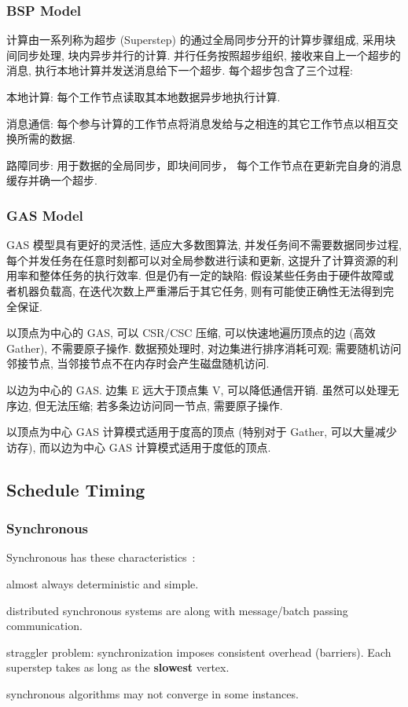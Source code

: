\documentclass[UTF8,12pt,a4paper]{article}
\begin{document}
\subsubsection{BSP Model}
计算由一系列称为超步 (Superstep) 的通过全局同步分开的计算步骤组成,
采用块间同步处理, 块内异步并行的计算.
并行任务按照超步组织, 接收来自上一个超步的消息, 执行本地计算并发送消息给下一个超步.
每个超步包含了三个过程:
\begin{compactitem}
  \item 本地计算: 每个工作节点读取其本地数据异步地执行计算.
  \item 消息通信: 
  每个参与计算的工作节点将消息发给与之相连的其它工作节点以相互交换所需的数据.
  \item 路障同步: 用于数据的全局同步，即块间同步，
  每个工作节点在更新完自身的消息缓存并确一个超步.
\end{compactitem}
\subsubsection{GAS Model}
GAS 模型具有更好的灵活性, 适应大多数图算法,
并发任务间不需要数据同步过程, 每个并发任务在任意时刻都可以对全局参数进行读和更新,
这提升了计算资源的利用率和整体任务的执行效率.
但是仍有一定的缺陷: 假设某些任务由于硬件故障或者机器负载高,
在迭代次数上严重滞后于其它任务, 则有可能使正确性无法得到完全保证.
\begin{compactitem}
  \item 以顶点为中心的 GAS, 可以 CSR/CSC 压缩, 可以快速地遍历顶点的边 (高效 Gather), 不需要原子操作.
  数据预处理时, 对边集进行排序消耗可观; 
  需要随机访问邻接节点, 当邻接节点不在内存时会产生磁盘随机访问.
  \item 以边为中心的 GAS. 边集 E 远大于顶点集 V, 可以降低通信开销.
  虽然可以处理无序边, 但无法压缩;
  若多条边访问同一节点, 需要原子操作.
  \item 以顶点为中心 GAS 计算模式适用于度高的顶点 (特别对于 Gather, 可以大量减少访存),
  而以边为中心 GAS 计算模式适用于度低的顶点.
\end{compactitem}

\subsection{Schedule Timing}
\subsubsection{Synchronous}
Synchronous has these characteristics~\cite{DBLP:journals/csur/McCuneWM15}:
\begin{compactitem}
  \item almost always deterministic and simple.
  \item distributed synchronous systems are along with message/batch passing communication.
  \item straggler problem: synchronization imposes consistent overhead (barriers).
  Each superstep takes as long as the \textbf{slowest} vertex.
  \item synchronous algorithms may not converge in some instances.
\end{compactitem}
\end{document}
